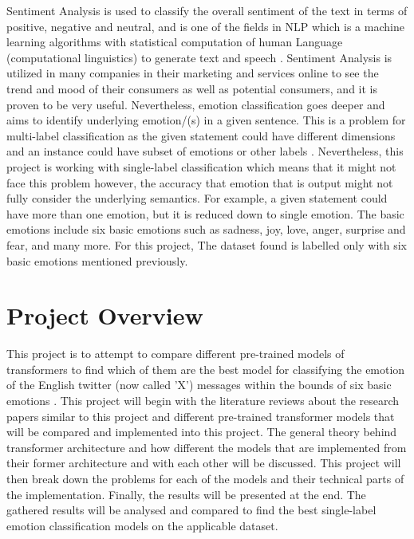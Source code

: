 Sentiment Analysis is used to classify the overall sentiment of the text in terms of positive, negative and neutral, 
and is one of the fields in NLP which is a machine learning algorithms with statistical computation of human Language (computational linguistics) to generate text and speech \cite{nlp}. 
Sentiment Analysis is utilized in many companies in their marketing and services online to see the trend and mood of their consumers as well as potential consumers, and it is proven to be very useful.
Nevertheless, emotion classification goes deeper and aims to identify underlying emotion/(s) in a given sentence.
This is a problem for multi-label classification as the given statement could have different dimensions and an instance could have subset of emotions or other labels \cite{AMEER2023118534}. Nevertheless, this project is working with single-label classification which means that it might not face this problem however, the accuracy that emotion that is output might not fully consider the underlying semantics.
For example, a given statement could have more than one emotion, but it is reduced down to single emotion.
The basic emotions include six basic emotions such as sadness, joy, love, anger, surprise and fear, and many more.
For this project, The dataset \cite{Pandey_2021} found is labelled only with six basic emotions mentioned previously.

\section{Project Overview}

This project is to attempt to compare different pre-trained models of transformers to find which of them are the best model for classifying the emotion of the English twitter (now called 'X') messages within the bounds of six basic emotions \cite{Pandey_2021}.
This project will begin with the literature reviews about the research papers similar to this project and different pre-trained transformer models that will be compared and implemented into this project. 
The general theory behind transformer architecture and how different the models that are implemented from their former architecture and with each other will be discussed.
This project will then break down the problems for each of the models and their technical parts of the implementation. 
Finally, the results will be presented at the end. The gathered results will be analysed and compared to find the best single-label emotion classification models on the applicable dataset.

